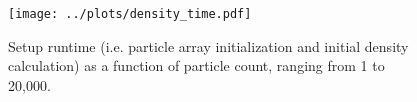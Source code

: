 \documentclass[onecolumn,12pt]{article}
\begin{document}
\begin{figure}
    \centering
    \texttt{[image: ../plots/density\_time.pdf]}
    \caption{Setup runtime (i.e. particle array initialization and initial density calculation) as a function of particle count, ranging from 1 to 20,000.}
    \label{fig:density_time}
\end{figure}

\printbibliography
\end{document}
